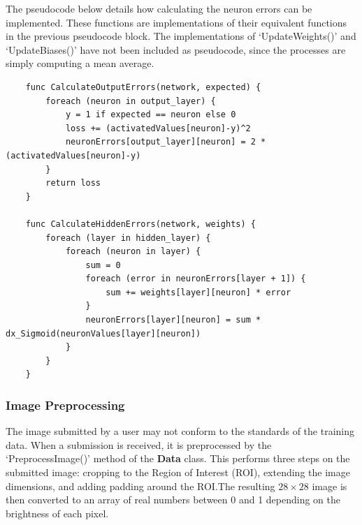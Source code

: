 \documentclass{article}
\begin{document}


\noindent The pseudocode below details how calculating the neuron errors can be implemented. These functions are implementations of their equivalent functions in the previous pseudocode block. The implementations of `UpdateWeights()' and `UpdateBiases()' have not been included as pseudocode, since the processes are simply computing a mean average.
\begin{verbatim}
    func CalculateOutputErrors(network, expected) {
        foreach (neuron in output_layer) {
            y = 1 if expected == neuron else 0
            loss += (activatedValues[neuron]-y)^2
            neuronErrors[output_layer][neuron] = 2 * (activatedValues[neuron]-y)
        }
        return loss
    }

    func CalculateHiddenErrors(network, weights) {
        foreach (layer in hidden_layer) {
            foreach (neuron in layer) {
                sum = 0
                foreach (error in neuronErrors[layer + 1]) {
                    sum += weights[layer][neuron] * error
                }
                neuronErrors[layer][neuron] = sum * dx_Sigmoid(neuronValues[layer][neuron])
            }
        }
    }
\end{verbatim}

\subsubsection{Image Preprocessing}

The image submitted by a user may not conform to the standards of the training data. When a submission is received, it is preprocessed by the `PreprocessImage()' method of the \textbf{Data} class. This performs three steps on the submitted image: cropping to the Region of Interest (ROI), extending the image dimensions, and adding padding around the ROI.\@ The resulting \(28\times 28\) image is then converted to an array of real numbers between 0 and 1 depending on the brightness of each pixel. \\
\end{document}

